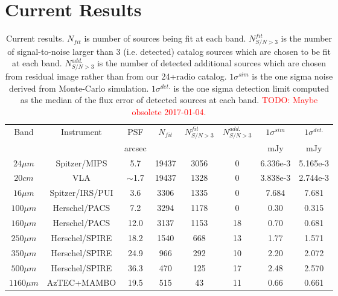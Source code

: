 \documentclass[11pt,a4paper]{article}
\begin{document}
\clearpage

\section{Current Results}
\label{CurrentResults}

\begin{table}[h]
	\centering
	\begin{tabular}{cccccccc}
		\hline
		\hline
		Band         &  Instrument  &   PSF  &  $N_{fit}$ &  $N^{fit}_{S/N>3}$ &  $N^{add.}_{S/N>3}$ &  $1\sigma^{sim}$ &  $1\sigma^{det.}$ \\
		&              & arcsec &            &              &                    &              mJy &               mJy \\
		\hline                                                                                                                         
		$24{\mu}m$   &     Spitzer/MIPS  &       5.7 &      19437 &         3056 &          0 &         6.336e-3 &          5.165e-3 \\
		$20{c}m$     &              VLA  & $\sim$1.7 &      19437 &         1328 &          0 &         3.838e-3 &          2.744e-3 \\
		$16{\mu}m$   &  Spitzer/IRS/PUI  &       3.6 &       3306 &         1335 &          0 &            7.684 &             7.681 \\
		$100{\mu}m$  &    Herschel/PACS  &       7.2 &       3294 &         1178 &          0 &             0.30 &             0.315 \\
		$160{\mu}m$  &    Herschel/PACS  &      12.0 &       3137 &         1153 &         18 &             0.70 &             0.681 \\
		$250{\mu}m$  &   Herschel/SPIRE  &      18.2 &       1540 &          668 &         13 &             1.77 &             1.571 \\
		$350{\mu}m$  &   Herschel/SPIRE  &      24.9 &        966 &          292 &         10 &             2.20 &             2.072 \\
		$500{\mu}m$  &   Herschel/SPIRE  &      36.3 &        470 &          125 &         17 &             2.48 &             2.570 \\
		$1160{\mu}m$ &      AzTEC+MAMBO  &      19.5 &        515 &           43 &         11 &             0.66 &             0.661 \\
		\hline
	\end{tabular}
	\caption{ Current results. $N_{fit}$ is number of sources being fit at each band. $N^{fit}_{S/N>3}$ is the number of signal-to-noise larger than 3 (i.e. detected) catalog sources which are chosen to be fit at each band. $N^{add.}_{S/N>3}$ is the number of detected additional sources which are chosen from residual image rather than from our 24+radio catalog. $1\sigma^{sim}$ is the one sigma noise derived from Monte-Carlo simulation. $1\sigma^{det.}$ is the one sigma detection limit computed as the median of the flux error of detected sources at each band. 
		\textcolor{red}{TODO: Maybe obsolete 2017-01-04.}
		\label{CurrentResultsTable}}
\end{table}
\end{document}
